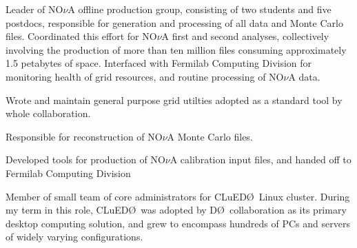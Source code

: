 \documentclass[amsmath,amssymb]{revtex4}
\def\dzero{D\O}
\def\cluedo{CLuED\O}
\begin{document}
\begin{list}{}
            {\setlength{\itemsep}{0.0in}\setlength{\parsep}{0.0in}
             \addtolength{\parskip}{-0.5in}}
\item Leader of NO$\nu$A offline production group, consisting of 
  two students and five postdocs, responsible for generation and
  processing of all data and Monte Carlo files.  Coordinated this
  effort for NO$\nu$A first and second analyses, collectively involving
  the production of more than ten million files consuming approximately
  1.5 petabytes of space. Interfaced with Fermilab Computing Division for
  monitoring health of grid resources, and routine processing of NO$\nu$A data.
\item Wrote and maintain general purpose grid utilties adopted
  as a standard tool by whole collaboration.
\item Responsible for reconstruction of NO$\nu$A Monte Carlo files.
\item Developed tools for production of NO$\nu$A calibration input files, and
  handed off to Fermilab Computing Division
\item Member of small team of core administrators for \cluedo\ Linux
  cluster.  During my term in this role, \cluedo~was adopted by
  \dzero~collaboration as its primary desktop computing solution, and
  grew to encompass hundreds of PCs and servers of widely varying
  configurations.
\end{list}

\\
\end{document}
